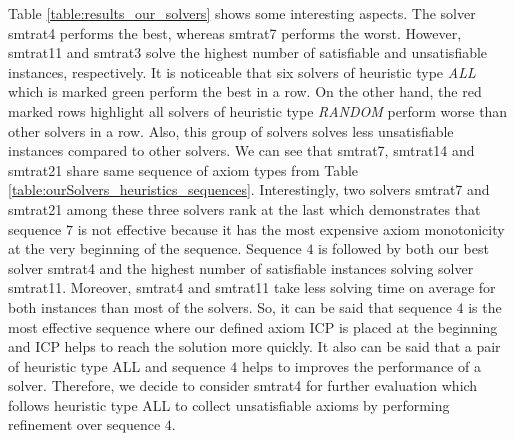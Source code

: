 \noindent Table \ref{table:results_our_solvers} shows some interesting aspects.
The solver smtrat4 performs the best, whereas smtrat7 performs the worst.
However, smtrat11 and smtrat3 solve the highest number of satisfiable and unsatisfiable instances, respectively.
It is noticeable that six solvers of heuristic type \textit{ALL} which is marked green perform the best in a row.
On the other hand, the red marked rows highlight all solvers of heuristic type \textit{RANDOM} perform worse than other solvers in a row.
Also, this group of solvers solves less unsatisfiable instances compared to other solvers.
We can see that smtrat7, smtrat14 and smtrat21 share same sequence of axiom types from Table \ref{table:ourSolvers_heuristics_sequences}.
Interestingly, two solvers smtrat7 and smtrat21 among these three solvers rank at the last which demonstrates that sequence $7$ is not effective because it has the most  expensive axiom monotonicity at the very beginning of the sequence.
Sequence $4$ is followed by both our best solver smtrat4 and the highest number of satisfiable instances solving solver smtrat11.
Moreover, smtrat4 and smtrat11 take less solving time on average for both instances than most of the solvers.
So, it can be said that sequence $4$ is the most effective sequence where our defined axiom ICP is placed at the beginning and ICP helps to reach the solution more quickly.
It also can be said that a pair of heuristic type ALL and sequence $4$ helps to improves the performance of a solver.
Therefore, we decide to consider smtrat4  for further evaluation which follows heuristic type ALL to collect unsatisfiable axioms by performing refinement over sequence $4$.\newline

